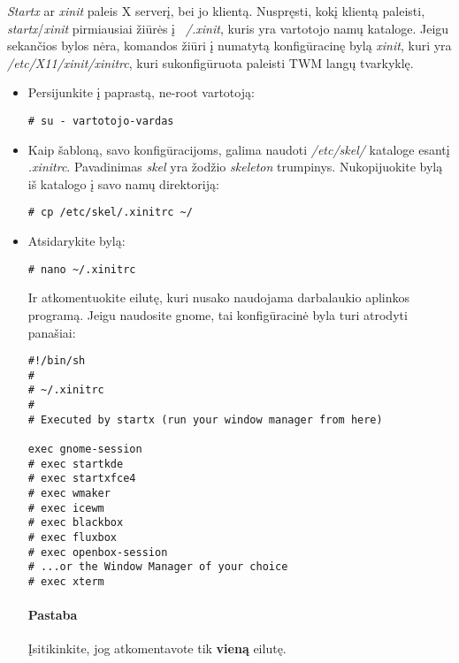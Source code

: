         \textsl{Startx} ar \textsl{xinit } paleis X serverį, bei jo
        klientą. Nuspręsti, kokį klientą paleisti, \textsl{startx}/\textsl{xinit}
        pirmiausiai žiūrės į \textsl{~/.xinit}, kuris yra vartotojo
        namų kataloge. Jeigu sekančios bylos nėra, komandos žiūri į
        numatytą konfigūracinę bylą \textsl{xinit}, kuri yra
        \textsl{/etc/X11/xinit/xinitrc}, kuri sukonfigūruota paleisti
        TWM langų tvarkyklę.

        \begin{itemize}

          \item Persijunkite į paprastą, ne-root vartotoją:

            \begin{verbatim}
# su - vartotojo-vardas
            \end{verbatim}
            

          \item Kaip šabloną, savo konfigūracijoms, galima naudoti
            \textsl{/etc/skel/} kataloge esantį
            \textsl{.xinitrc}. Pavadinimas \textsl{skel} yra žodžio
            \textsl{skeleton} trumpinys. Nukopijuokite bylą iš
            katalogo į savo namų direktoriją:

            \begin{verbatim}
# cp /etc/skel/.xinitrc ~/
            \end{verbatim}

          \item Atsidarykite bylą:

            \begin{verbatim}
# nano ~/.xinitrc
            \end{verbatim}

            Ir atkomentuokite eilutę, kuri nusako naudojama
            darbalaukio aplinkos programą. Jeigu naudosite gnome, tai
            konfigūracinė byla turi atrodyti panašiai:

            \begin{verbatim}
#!/bin/sh
#
# ~/.xinitrc
#
# Executed by startx (run your window manager from here)

exec gnome-session
# exec startkde
# exec startxfce4
# exec wmaker
# exec icewm
# exec blackbox
# exec fluxbox
# exec openbox-session
# ...or the Window Manager of your choice
# exec xterm
            \end{verbatim}

            \paragraph{Pastaba} Įsitikinkite, jog atkomentavote tik
            \textbf{vieną} eilutę.

        \end{itemize}

